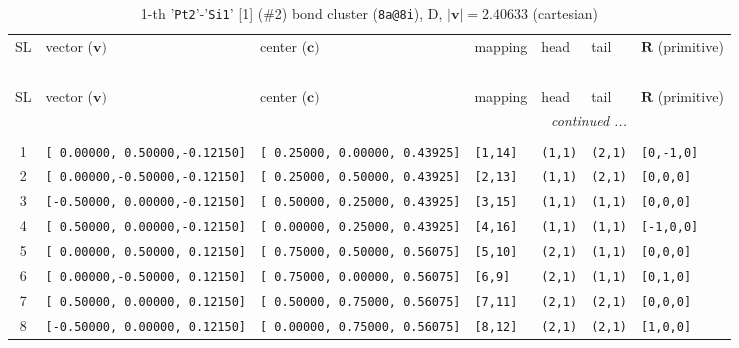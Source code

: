 \documentclass[fleqn,10pt,landscape]{jsarticle}
\begin{document}
\renewcommand{\arraystretch}{1.6}
\begin{longtable}[l]{cllllll}
\captionsetup{justification=raggedright, singlelinecheck=off}
\caption{1-th '\texttt{Pt2}'-'\texttt{Si1}' [1] (\#2) bond cluster (\texttt{8a@8i}), D, $|\bm{v}|=2.40633$ (cartesian)}
 \\
 \hline \hline
SL & vector ($\bm{v})$ & center ($\bm{c})$ & mapping & head & tail & $\bm{R}$ (primitive) \\ \hline \endfirsthead

\multicolumn{6}{l}{\tablename\ \thetable{}} \\
 \hline \hline
SL & vector ($\bm{v})$ & center ($\bm{c})$ & mapping & head & tail & $\bm{R}$ (primitive) \\ \hline \endhead

 \hline \hline
\multicolumn{6}{r}{\footnotesize\it continued ...} \\ \endfoot

 \hline \hline
\multicolumn{6}{r}{} \\ \endlastfoot

1 & \texttt{[ 0.00000, 0.50000,-0.12150]} & \texttt{[ 0.25000, 0.00000, 0.43925]} & \texttt{[1,14]} & \texttt{(1,1)} & \texttt{(2,1)} & \texttt{[0,-1,0]} \\ \hline
2 & \texttt{[ 0.00000,-0.50000,-0.12150]} & \texttt{[ 0.25000, 0.50000, 0.43925]} & \texttt{[2,13]} & \texttt{(1,1)} & \texttt{(2,1)} & \texttt{[0,0,0]} \\ \hline
3 & \texttt{[-0.50000, 0.00000,-0.12150]} & \texttt{[ 0.50000, 0.25000, 0.43925]} & \texttt{[3,15]} & \texttt{(1,1)} & \texttt{(1,1)} & \texttt{[0,0,0]} \\ \hline
4 & \texttt{[ 0.50000, 0.00000,-0.12150]} & \texttt{[ 0.00000, 0.25000, 0.43925]} & \texttt{[4,16]} & \texttt{(1,1)} & \texttt{(1,1)} & \texttt{[-1,0,0]} \\ \hline
5 & \texttt{[ 0.00000, 0.50000, 0.12150]} & \texttt{[ 0.75000, 0.50000, 0.56075]} & \texttt{[5,10]} & \texttt{(2,1)} & \texttt{(1,1)} & \texttt{[0,0,0]} \\ \hline
6 & \texttt{[ 0.00000,-0.50000, 0.12150]} & \texttt{[ 0.75000, 0.00000, 0.56075]} & \texttt{[6,9]} & \texttt{(2,1)} & \texttt{(1,1)} & \texttt{[0,1,0]} \\ \hline
7 & \texttt{[ 0.50000, 0.00000, 0.12150]} & \texttt{[ 0.50000, 0.75000, 0.56075]} & \texttt{[7,11]} & \texttt{(2,1)} & \texttt{(2,1)} & \texttt{[0,0,0]} \\ \hline
8 & \texttt{[-0.50000, 0.00000, 0.12150]} & \texttt{[ 0.00000, 0.75000, 0.56075]} & \texttt{[8,12]} & \texttt{(2,1)} & \texttt{(2,1)} & \texttt{[1,0,0]} \\
\end{longtable}
\end{document}
